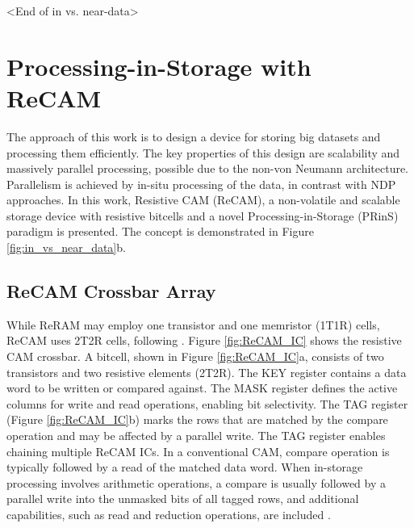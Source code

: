 \documentclass{superfri}
\begin{document}
<End of in vs. near-data>

\section{Processing-in-Storage with ReCAM}
\label{sec:PRinS_with_ReCAM}

The approach of this work is to design a device for storing big datasets and processing them efficiently. The key properties of this design are scalability and massively parallel processing, possible due to the non-von Neumann architecture. Parallelism is achieved by in-situ processing of the data, in contrast with NDP approaches. In this work, Resistive CAM (ReCAM), a non-volatile and scalable storage device with resistive bitcells and a novel Processing-in-Storage (PRinS) paradigm is presented. The concept is demonstrated in Figure \ref{fig:in_vs_near_data}b.

\subsection{ReCAM Crossbar Array}
\label{sec:ReCAM_crossbar}
While ReRAM may employ one transistor and one memristor (1T1R) cells, ReCAM uses 2T2R cells, following \cite{akinaga2010resistive}\cite{azarkhish2017logic}. Figure \ref{fig:ReCAM_IC} shows the resistive CAM crossbar. A bitcell, shown in Figure \ref{fig:ReCAM_IC}a, consists of two transistors and two resistive elements (2T2R). The KEY register contains a data word to be written or compared against. The MASK register defines the active columns for write and read operations, enabling bit selectivity. The TAG register (Figure \ref{fig:ReCAM_IC}b) marks the rows that are matched by the compare operation and may be affected by a parallel write. The TAG register enables chaining multiple ReCAM ICs.
In a conventional CAM, compare operation is typically followed by a read of the matched data word. When in-storage processing involves arithmetic operations, a compare is usually followed by a parallel write into the unmasked bits of all tagged rows, and additional capabilities, such as read and reduction operations, are included \cite{yavits2015resistive}. 

\end{document}
